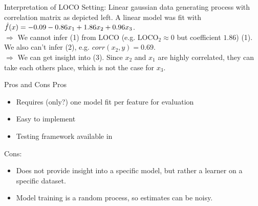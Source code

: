 \documentclass[11pt,compress,t,notes=noshow, xcolor=table]{beamer}
\begin{document}
\begin{vbframe}{Interpretation of LOCO}
Setting: Linear gaussian data generating process with correlation matrix as depicted left. A linear model was fit with $\fh(x) = -0.09 - 0.86 x_1 + 1.86 x_2 + 0.96 x_3$.\\
\lz
$\Rightarrow$ We cannot infer (1) from LOCO (e.g. $\text{LOCO}_2 \approx 0$ but coefficient $1.86$) (1). We also can't infer (2), e.g. $corr(x_2, y) = 0.69$.\\
$\Rightarrow$ We can get insight into (3). Since $x_2$ and $x_1$ are highly correlated, they can take each others place, which is not the case for $x_3$.
\framebreak


\end{vbframe}

\begin{vbframe}{Pros and Cons}
  Pros
  \begin{itemize}
    \item Requires (only?) one model fit per feature for evaluation
    \item Easy to implement
    \item Testing framework available in \cite{lei_distribution-free_2018}
  \end{itemize}
%
  Cons:
  \begin{itemize}
    \item Does not provide insight into a specific model, but rather a learner on a specific dataset.
    \item Model training is a random process, so estimates can be noisy.
  \end{itemize}
\end{vbframe}

\begin{vbframe}
  \printbibliography
\end{vbframe}

\endlecture
\end{document}

